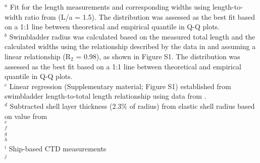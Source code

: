 \begin{flushleft}
$^a$ Fit for the length measurements and corresponding widths using length-to-width ratio from \citet{Stanton2000a} (L/a = 1.5). The distribution was assessed as the best fit based on a 1:1 line between theoretical and empirical quantile in Q-Q plots.\\
$^b$ Swimbladder radius was calculated based on the measured total length and the calculated widths using the relationship described by the data in \citep{Chu2003} and assuming a linear relationship (R$_2$ = 0.98), as shown in Figure S1. The distribution was assessed as the best fit based on a 1:1 line between theoretical and empirical quantile in Q-Q plots.\\
$^c$ Linear regression (Supplementary material; Figure S1) established from swimbladder length-to-total length relationship using data from \citet{Chu2003}.\\
$^d$ Subtracted shell layer thickness (2.3\% of radius) from elastic shell radius based on value from \citet{Lavery2007}\\
$^e$ \citet{Khodabandeloo2021}\\
$^f$ \citet{Stanton2000a}\\
$^g$ \citet{Feuillade1998}\\
$^h$ \citet{Lavery2007}\\
$^i$ Ship-based CTD measurements\\
$^j$ \citet{Liu2005}
\end{flushleft}

